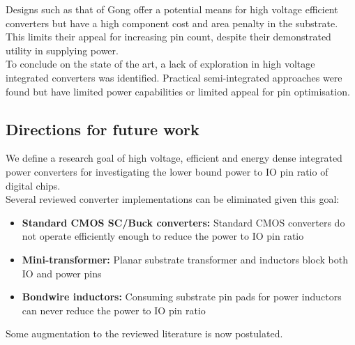 \documentclass[letterpaper,twocolumn,10pt]{article}
\begin{document}
Designs such as that of Gong offer a potential means for high voltage efficient converters but have a high component cost and area penalty in the substrate. This limits their appeal for increasing pin count, despite their demonstrated utility in supplying power.\\       
\indent To conclude on the state of the art, a lack of exploration in high voltage integrated converters was identified. Practical semi-integrated approaches were found but have limited power capabilities or limited appeal for pin optimisation. 

\subsection{Directions for future work}

We define a research goal of high voltage, efficient and energy dense integrated power converters for investigating the lower bound power to IO pin ratio of digital chips.\\
Several reviewed converter implementations can be eliminated given this goal:
\begin{itemize}
\item{\textbf{Standard CMOS SC/Buck converters: }Standard CMOS converters do not operate efficiently enough to reduce the power to IO pin ratio}
\item{\textbf{Mini-transformer: }Planar substrate transformer and inductors block both IO and power pins }
\item{\textbf{Bondwire inductors: }Consuming substrate pin pads for power inductors can never reduce the power to IO pin ratio}
\end{itemize}   
Some augmentation to the reviewed literature is now postulated.\\
\end{document}
